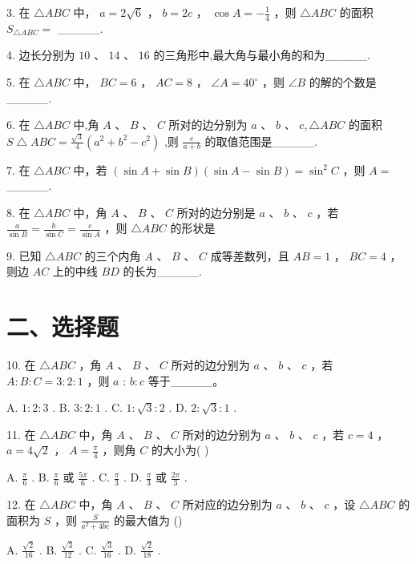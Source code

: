 3. 在 $\bigtriangleup  {ABC}$ 中， $a = 2\sqrt{6}$ ， $b = {2c}$ ， $\cos A =  - \frac{1}{4}$ ，则 $\bigtriangleup  {ABC}$ 的面积 ${S}_{\bigtriangleup {ABC}} =$ \_\_\_\_\_.

4. 边长分别为 ${10}\text{ 、 }{14}\text{ 、 }{16}$ 的三角形中,最大角与最小角的和为\_\_\_\_\_.

5. 在 $\bigtriangleup  {ABC}$ 中， ${BC} = 6$ ， ${AC} = 8$ ， $\angle A = {40}^{ \circ  }$ ，则 $\angle B$ 的解的个数是\_\_\_\_\_.

6. 在 $\bigtriangleup {ABC}$ 中,角 $A\text{ 、 }B\text{ 、 }C$ 所对的边分别为 $a\text{ 、 }b\text{ 、 }c,\bigtriangleup {ABC}$ 的面积 $S\bigtriangleup {ABC} = \frac{\sqrt{3}}{4}\left( {{a}^{2} + {b}^{2} - {c}^{2}}\right)$ ,则 $\frac{c}{a + b}$ 的取值范围是\_\_\_\_\_.

7. 在 $\bigtriangleup  {ABC}$ 中，若 $\left( {\sin A + \sin B}\right) \left( {\sin A - \sin B}\right)  = {\sin }^{2}C$ ，则 $A =$ \_\_\_\_\_.

8. 在 $\bigtriangleup  {ABC}$ 中，角 $A$ 、 $B$ 、 $C$ 所对的边分别是 $a$ 、 $b$ 、 $c$ ，若 $\frac{a}{\sin B} = \frac{b}{\sin C} = \frac{c}{\sin A}$ ，则 $\bigtriangleup  {ABC}$ 的形状是

9. 已知 $\bigtriangleup {ABC}$ 的三个内角 $A$ 、 $B$ 、 $C$ 成等差数列，且 ${AB} = 1$ ， ${BC} = 4$ ，则边 ${AC}$ 上的中线 ${BD}$ 的长为\_\_\_\_\_.

\section*{二、选择题}

10. 在 $\bigtriangleup  {ABC}$ ，角 $A$ 、 $B$ 、 $C$ 所对的边分别为 $a$ 、 $b$ 、 $c$ ，若 $A : B : C = 3 : 2 : 1$ ，则 $a$ : $b : c$ 等于\_\_\_\_\_。

A. $1 : 2 : 3$ . B. $3 : 2 : 1$ . C. $1 : \sqrt{3} : 2$ . D. $2 : \sqrt{3} : 1$ .

11. 在 $\bigtriangleup  {ABC}$ 中，角 $A$ 、 $B$ 、 $C$ 所对的边分别为 $a$ 、 $b$ 、 $c$ ，若 $c = 4$ ， $a = 4\sqrt{2}$ ， $A = \frac{\pi }{4}$ ，则角 $C$ 的大小为( )

A. $\frac{\pi }{6}$ . B. $\frac{\pi }{6}$ 或 $\frac{5\pi }{6}$ . C. $\frac{\pi }{3}$ . D. $\frac{\pi }{3}$ 或 $\frac{2\pi }{3}$ .

12. 在 $\bigtriangleup  {ABC}$ 中，角 $A$ 、 $B$ 、 $C$ 所对应的边分别为 $a$ 、 $b$ 、 $c$ ，设 $\bigtriangleup  {ABC}$ 的面积为 $S$ ，则 $\frac{S}{{a}^{2} + {4bc}}$ 的最大值为 ()

A. $\frac{\sqrt{2}}{16}$ . B. $\frac{\sqrt{3}}{12}$ . C. $\frac{\sqrt{3}}{16}$ . D. $\frac{\sqrt{2}}{18}$ .

